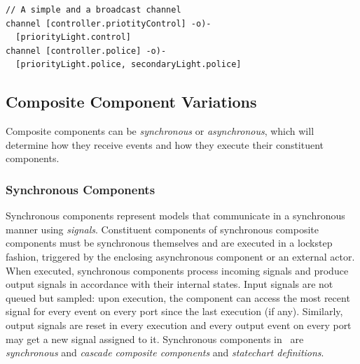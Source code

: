 
\begin{lstlisting}
// A simple and a broadcast channel
channel [controller.priotityControl] -o)-
  [priorityLight.control]
channel [controller.police] -o)-
  [priorityLight.police, secondaryLight.police]
\end{lstlisting}

\subsection{Composite Component Variations}
\label{sec:composite}

Composite components can be \emph{synchronous} or \emph{asynchronous}, which will determine how they receive events and how they execute their constituent components.

\subsubsection{Synchronous Components}
Synchronous components represent models that communicate
in a synchronous manner using \emph{signals}. Constituent components of synchronous composite components must be synchronous themselves and are executed in a lockstep fashion, triggered by the enclosing asynchronous component or an external actor.
When executed, synchronous components process incoming signals
and produce output signals in accordance with their internal states. Input signals are not queued but sampled: upon execution, the component can access the most recent signal for every event on every port since the last execution (if any). Similarly, output signals are reset in every execution and every output event on every port may get a new signal assigned to it.
Synchronous components in \gamma\ are \emph{synchronous} and \emph{cascade composite components} and \emph{statechart definitions}.%

